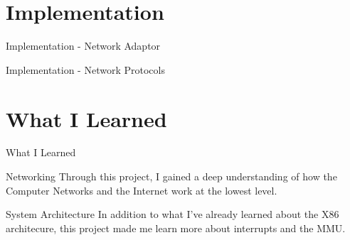 \documentclass{beamer}
\begin{document}
\section{Implementation}

    \begin{frame}{Implementation - Network Adaptor}

    \end{frame}

    \begin{frame}{Implementation - Network Protocols}

    \end{frame}

\section{What I Learned}

    \begin{frame}{What I Learned}
        \begin{block}{Networking}
            Through this project, I gained a deep understanding of how the Computer Networks and the Internet work at the lowest level.
        \end{block}
        \begin{block}{System Architecture}
            In addition to what I've already learned about the X86 architecure, this project made me learn more about interrupts and the MMU.
        \end{block}
    \end{frame}
\end{document}
